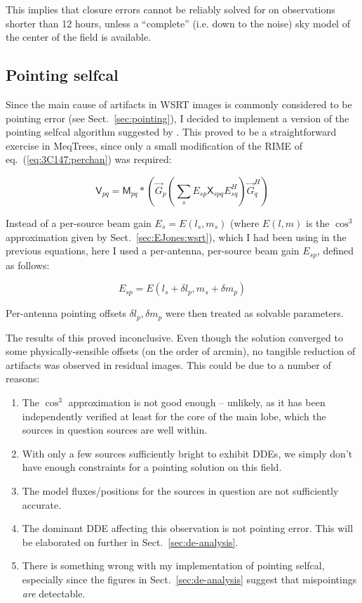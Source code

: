 \documentclass[]{aa}
\newcommand{\herm}{H}
\newcommand{\jones}[2]{\vec {#1}_{#2}}
\newcommand{\jonesT}[2]{\vec {#1}^{\herm}_{#2}}
\newcommand{\coh}[2]{\mathsf{{#1}}_{{#2}}}
\begin{document}
This implies that closure errors cannot be reliably solved for on observations shorter than 12 hours, unless a ``complete'' (i.e. down to the noise) sky model of the center of the field is available.

\subsection{Pointing selfcal\label{sec:3C147:pointing}}

Since the main cause of artifacts in WSRT images is commonly considered to be pointing error (see Sect.~\ref{sec:pointing}), I decided to implement a version of the pointing selfcal algorithm suggested by \citet{SB:pointing}. This proved to be a straightforward exercise in MeqTrees, since only a small modification of the RIME of eq.~(\ref{eq:3C147:perchan}) was required: 

\begin{equation}\label{eq:3C147:pointing}
\coh{V}{pq} = \coh{M}{pq} \ast \left ( \jones{G}{p} \left( \sum_s E_{sp} \coh{X}{spq} E^{\herm}_{sq} \right) \jonesT{G}{q} \right )
\end{equation}

Instead of a per-source beam gain $E_s=E(l_s,m_s)$ (where $E(l,m)$ is the $\cos^3$ approximation given by Sect.~\ref{sec:EJones:wsrt}), which I had been using in the previous equations, here I used a per-antenna, per-source beam gain $E_{sp}$, defined as follows:

\begin{equation}\label{eq:3C147:offset-beam}
E_{sp} = E(l_s+\delta l_p,m_s+\delta m_p)
\end{equation}

Per-antenna pointing offsets $\delta l_p,\delta m_p$ were then treated as solvable parameters. 

The results of this proved inconclusive. Even though the solution converged to some physically-sensible offsets (on the order of arcmin), no tangible reduction of artifacts was observed in residual images. This could be due to a number of reasons:

\begin{enumerate}
\item The $\cos^3$ approximation is not good enough -- unlikely, as it has been independently verified at least for the core of the main lobe, which the sources in question sources are well within.
\item With only a few sources sufficiently bright to exhibit DDEs, we simply don't have enough constraints for a pointing solution on this field.
\item The model fluxes/positions for the sources in question are not sufficiently accurate.
\item The dominant DDE affecting this observation is not pointing error. This will be elaborated on further in Sect.~\ref{sec:de-analysis}. 
\item There is something wrong with my implementation of pointing selfcal, especially since the figures in Sect.~\ref{sec:de-analysis} suggest that mispointings \emph{are} detectable.
\end{enumerate}
\end{document}
